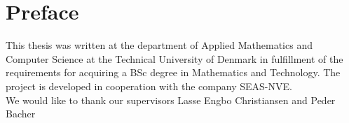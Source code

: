 \chapter{Preface}
This thesis was written at the department of Applied Mathematics and Computer Science at the Technical University of Denmark in fulfillment of the requirements for acquiring a BSc degree in Mathematics and Technology. The project is developed in cooperation with the company SEAS-NVE. \\

\noindent We would like to thank our supervisors Lasse Engbo Christiansen and Peder Bacher

\vfill

{
\begin{flushright}
    \thesisauthor{}
\end{flushright}
}